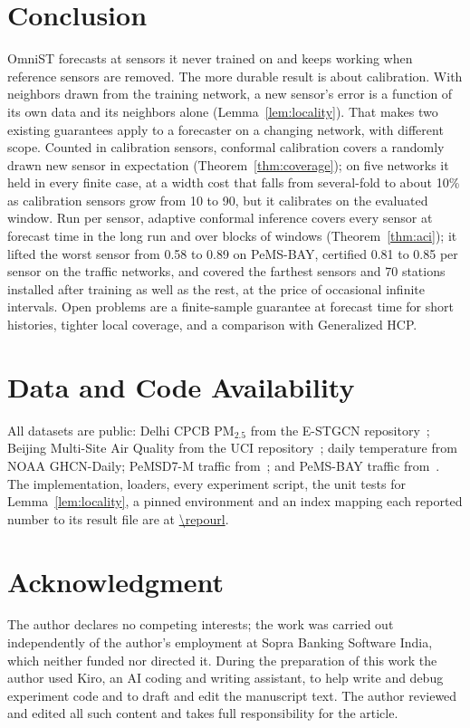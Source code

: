 \section{Conclusion}
\label{sec:conclusion}
OmniST forecasts at sensors it never trained on and keeps working when reference sensors are removed. The more
durable result is about calibration. With neighbors drawn from the training network, a new sensor's error is a
function of its own data and its neighbors alone (Lemma~\ref{lem:locality}). That makes two existing guarantees
apply to a forecaster on a changing network, with different scope. Counted in calibration sensors, conformal
calibration covers a randomly drawn new sensor in expectation (Theorem~\ref{thm:coverage}); on five networks it
held in every finite case, at a width cost that falls from several-fold to about 10\% as calibration sensors
grow from 10 to 90, but it calibrates on the evaluated window. Run per sensor, adaptive conformal inference covers
every sensor at forecast time in the long run and over blocks of windows (Theorem~\ref{thm:aci}); it lifted the
worst sensor from 0.58 to 0.89 on PeMS-BAY, certified 0.81 to 0.85 per sensor on the traffic networks, and covered the
farthest sensors and 70 stations installed after training as well as the rest, at the price of occasional infinite
intervals.   Open problems are a finite-sample guarantee at forecast time for short histories, tighter local coverage, and a comparison with Generalized HCP.
\section*{Data and Code Availability}
All datasets are public: Delhi CPCB PM$_{2.5}$ from the E-STGCN repository~\cite{panja2026estgcn};
Beijing Multi-Site Air Quality from the UCI repository~\cite{zhang2017beijingair}; daily temperature from NOAA
GHCN-Daily; PeMSD7-M traffic from~\cite{yu2018stgcn}; and PeMS-BAY traffic from~\cite{li2018dcrnn}. The
implementation, loaders, every experiment script, the unit tests for Lemma~\ref{lem:locality}, a pinned environment and
an index mapping each reported number to its result file are at \url{\repourl}.
\section*{Acknowledgment}
The author declares no competing interests; the work was carried out
independently of the author's employment at Sopra Banking Software India, which neither funded nor
directed it. During the preparation of this work the author used Kiro, an AI coding and writing
assistant, to help write and debug experiment code and to draft and edit the manuscript text. The
author reviewed and edited all such content and takes full responsibility for the article.

